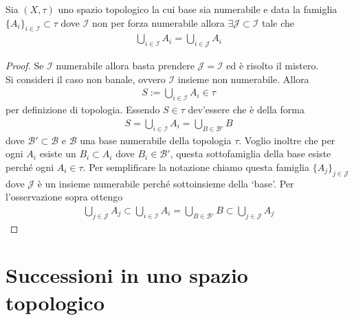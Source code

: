 \begin{theorem}
	Sia $(X,\tau)$ uno spazio topologico la cui base sia numerabile e data la famiglia $\{A_i\}_{i\in \mathcal{I}} \subset \tau$ dove $\mathcal{I}$ non per forza numerabile allora $\exists \mathcal{J} \subset \mathcal{I}$ tale che 
	\begin{equation}
	\begin{aligned}
		\bigcup_{i \in \mathcal{I}} A_i = \bigcup_{i \in \mathcal{J}} A_i
	\end{aligned}
	\end{equation}
\end{theorem}
\begin{proof}
	Se $\mathcal{I}$ numerabile allora basta prendere $\mathcal{J} = \mathcal{I}$ ed è risolto il mistero.\\
	Si consideri il caso non banale, ovvero $\mathcal{I}$ insieme non numerabile. Allora 
	\begin{equation}
	\begin{aligned}
		S := \bigcup_{i \in \mathcal{I}} A_i \in \tau
	\end{aligned}
	\end{equation}
	per definizione di topologia. Essendo $S \in \tau$ dev'essere che è della forma
	\begin{equation}
	\begin{aligned}
		S = \bigcup_{i \in \mathcal{I}} A_i = \bigcup_{B \in \mathcal{B}'} B
	\end{aligned}
	\end{equation}
	dove $\mathcal{B}' \subset \mathcal{B}$ e $\mathcal{B}$ una base numerabile della topologia $\tau$. Voglio inoltre che per ogni $A_i$ esiste un $B_i \subset A_i$ dove $B_i \in \mathcal{B}'$, questa sottofamiglia della base esiste perché ogni $A_i \in \tau$. Per semplificare la notazione chiamo questa famiglia $\{A_j\}_{j \in \mathcal{J}}$ dove $\mathcal{J}$ è un insieme numerabile perché sottoinsieme della `base'. Per l'osservazione sopra ottengo
	\begin{equation}
	\begin{aligned}
		\bigcup_{j \in \mathcal{J}}  A_j \subset \bigcup_{i \in \mathcal{I}} A_i = \bigcup_{B \in \mathcal{B}'} B \subset \bigcup_{j \in \mathcal{J}}  A_j
	\end{aligned}
	\end{equation}
\end{proof}

\section{Successioni in uno spazio topologico}

